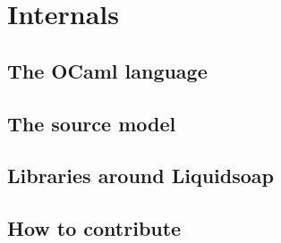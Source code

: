 \chapter{Internals}
\section{The OCaml language}

\section{The source model}

\section{Libraries around Liquidsoap}

\section{How to contribute}

